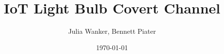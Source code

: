 \documentclass[11pt,a4paper]{article}
\begin{document}
	\title{IoT Light Bulb Covert Channel}
	\author{Julia Wanker, Bennett Piater}
	\date{\today}
	\maketitle



	
	
\end{document}
